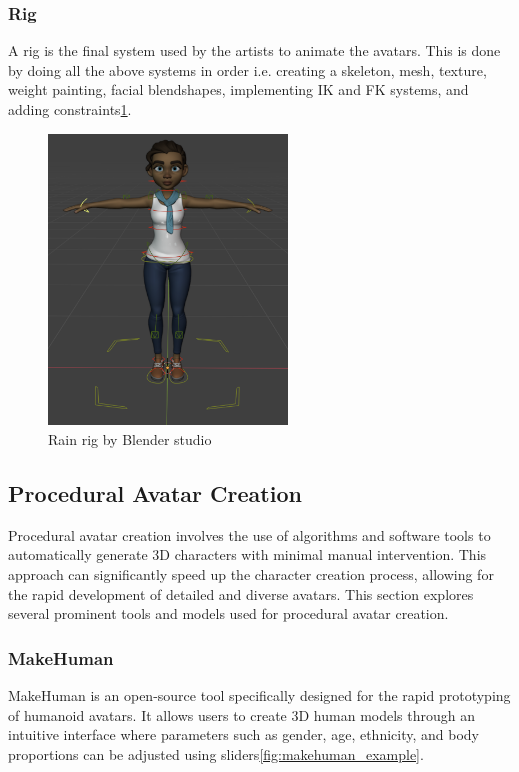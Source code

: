 \subsubsection{Rig}

A rig is the final system used by the artists to animate the avatars. This is done by doing all the above systems in order i.e. creating a skeleton, mesh, texture, weight painting, facial blendshapes, implementing IK and FK systems, and adding constraints\ref{fig:rig_example}.

\begin{figure}
  \centering \includegraphics[width = 2.5in]{images/background_work/rig_example.png}
  \caption{Rain rig by Blender studio}
  \label{fig:rig_example}
\end{figure}

\subsection{Procedural Avatar Creation}

Procedural avatar creation involves the use of algorithms and software tools to automatically generate 3D characters with minimal manual intervention. This approach can significantly speed up the character creation process, allowing for the rapid development of detailed and diverse avatars. This section explores several prominent tools and models used for procedural avatar creation.

\subsubsection{MakeHuman}

MakeHuman is an open-source tool specifically designed for the rapid prototyping of humanoid avatars. It allows users to create 3D human models through an intuitive interface where parameters such as gender, age, ethnicity, and body proportions can be adjusted using sliders\ref{fig:makehuman_example}.

